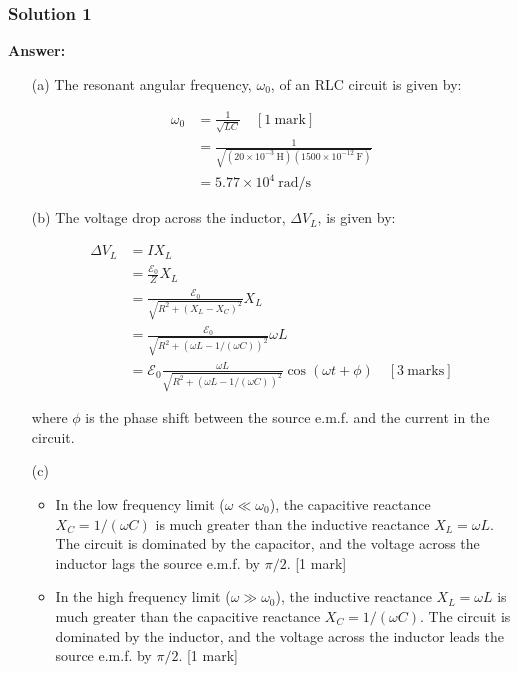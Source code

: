 \documentclass{article}
\begin{document}
\subsubsection{Solution 1}
\textbf{Answer:}

\begin{enumerate}
\item[(a)] The resonant angular frequency, $\omega_0$, of an RLC circuit is given by:

\begin{align*}
\omega_0 &= \frac{1}{\sqrt{LC}} \quad [1~\mathrm{mark}]\\
&= \frac{1}{\sqrt{(20 \times 10^{-3}~\mathrm{H})(1500 \times 10^{-12}~\mathrm{F})}} \\
&= 5.77 \times 10^4~\mathrm{rad/s} 
\end{align*}

\item[(b)] The voltage drop across the inductor, $\Delta V_L$, is given by:

\begin{align*}
\Delta V_L &= I X_L  \\
&= \frac{\mathcal{E}_0}{Z} X_L \\
&= \frac{\mathcal{E}_0}{\sqrt{R^2 + (X_L - X_C)^2}} X_L \\
&= \frac{\mathcal{E}_0}{\sqrt{R^2 + (\omega L - 1/(\omega C))^2}} \omega L \\
&= \mathcal{E}_0 \frac{\omega L}{\sqrt{R^2 + (\omega L - 1/(\omega C))^2}} \cos(\omega t + \phi) \quad [3~\mathrm{marks}]
\end{align*}

where $\phi$ is the phase shift between the source e.m.f. and the current in the circuit.

\item[(c)] 
\begin{itemize}
\item In the low frequency limit ($\omega \ll \omega_0$), the capacitive reactance $X_C = 1/(\omega C)$ is much greater than the inductive reactance $X_L = \omega L$.  The circuit is dominated by the capacitor, and the voltage across the inductor lags the source e.m.f. by $\pi/2$. [1 mark]
\item In the high frequency limit ($\omega \gg \omega_0$), the inductive reactance $X_L = \omega L$ is much greater than the capacitive reactance $X_C = 1/(\omega C)$. The circuit is dominated by the inductor, and the voltage across the inductor leads the source e.m.f. by $\pi/2$. [1 mark]
\end{itemize}
\end{enumerate}
\end{document}
